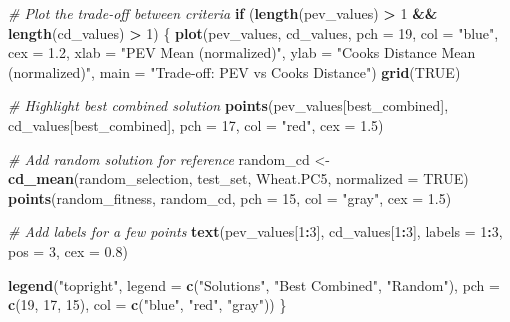 \documentclass[
]{article}
\newenvironment{Shaded}{\begin{snugshade}}{\end{snugshade}}
\newcommand{\AttributeTok}[1]{\textcolor[rgb]{0.13,0.29,0.53}{#1}}
\newcommand{\CommentTok}[1]{\textcolor[rgb]{0.56,0.35,0.01}{\textit{#1}}}
\newcommand{\ConstantTok}[1]{\textcolor[rgb]{0.56,0.35,0.01}{#1}}
\newcommand{\ControlFlowTok}[1]{\textcolor[rgb]{0.13,0.29,0.53}{\textbf{#1}}}
\newcommand{\DecValTok}[1]{\textcolor[rgb]{0.00,0.00,0.81}{#1}}
\newcommand{\FloatTok}[1]{\textcolor[rgb]{0.00,0.00,0.81}{#1}}
\newcommand{\FunctionTok}[1]{\textcolor[rgb]{0.13,0.29,0.53}{\textbf{#1}}}
\newcommand{\NormalTok}[1]{#1}
\newcommand{\OtherTok}[1]{\textcolor[rgb]{0.56,0.35,0.01}{#1}}
\newcommand{\SpecialCharTok}[1]{\textcolor[rgb]{0.81,0.36,0.00}{\textbf{#1}}}
\newcommand{\StringTok}[1]{\textcolor[rgb]{0.31,0.60,0.02}{#1}}
\begin{document}
\begin{Shaded}
\begin{Highlighting}[]
\CommentTok{\# Plot the trade{-}off between criteria}
\ControlFlowTok{if}\NormalTok{ (}\FunctionTok{length}\NormalTok{(pev\_values) }\SpecialCharTok{\textgreater{}} \DecValTok{1} \SpecialCharTok{\&\&} \FunctionTok{length}\NormalTok{(cd\_values) }\SpecialCharTok{\textgreater{}} \DecValTok{1}\NormalTok{) \{}
  \FunctionTok{plot}\NormalTok{(pev\_values, cd\_values,}
       \AttributeTok{pch =} \DecValTok{19}\NormalTok{, }\AttributeTok{col =} \StringTok{"blue"}\NormalTok{, }\AttributeTok{cex =} \FloatTok{1.2}\NormalTok{,}
       \AttributeTok{xlab =} \StringTok{"PEV Mean (normalized)"}\NormalTok{, }
       \AttributeTok{ylab =} \StringTok{"Cook\textquotesingle{}s Distance Mean (normalized)"}\NormalTok{,}
       \AttributeTok{main =} \StringTok{"Trade{-}off: PEV vs Cook\textquotesingle{}s Distance"}\NormalTok{)}
  \FunctionTok{grid}\NormalTok{(}\ConstantTok{TRUE}\NormalTok{)}
  
  \CommentTok{\# Highlight best combined solution}
  \FunctionTok{points}\NormalTok{(pev\_values[best\_combined], cd\_values[best\_combined], }
         \AttributeTok{pch =} \DecValTok{17}\NormalTok{, }\AttributeTok{col =} \StringTok{"red"}\NormalTok{, }\AttributeTok{cex =} \FloatTok{1.5}\NormalTok{)}
  
  \CommentTok{\# Add random solution for reference}
\NormalTok{  random\_cd }\OtherTok{\textless{}{-}} \FunctionTok{cd\_mean}\NormalTok{(random\_selection, test\_set, Wheat.PC5, }\AttributeTok{normalized =} \ConstantTok{TRUE}\NormalTok{)}
  \FunctionTok{points}\NormalTok{(random\_fitness, random\_cd, }\AttributeTok{pch =} \DecValTok{15}\NormalTok{, }\AttributeTok{col =} \StringTok{"gray"}\NormalTok{, }\AttributeTok{cex =} \FloatTok{1.5}\NormalTok{)}
  
  \CommentTok{\# Add labels for a few points}
  \FunctionTok{text}\NormalTok{(pev\_values[}\DecValTok{1}\SpecialCharTok{:}\DecValTok{3}\NormalTok{], cd\_values[}\DecValTok{1}\SpecialCharTok{:}\DecValTok{3}\NormalTok{], }\AttributeTok{labels =} \DecValTok{1}\SpecialCharTok{:}\DecValTok{3}\NormalTok{, }\AttributeTok{pos =} \DecValTok{3}\NormalTok{, }\AttributeTok{cex =} \FloatTok{0.8}\NormalTok{)}
  
  \FunctionTok{legend}\NormalTok{(}\StringTok{"topright"}\NormalTok{, }
         \AttributeTok{legend =} \FunctionTok{c}\NormalTok{(}\StringTok{"Solutions"}\NormalTok{, }\StringTok{"Best Combined"}\NormalTok{, }\StringTok{"Random"}\NormalTok{),}
         \AttributeTok{pch =} \FunctionTok{c}\NormalTok{(}\DecValTok{19}\NormalTok{, }\DecValTok{17}\NormalTok{, }\DecValTok{15}\NormalTok{),}
         \AttributeTok{col =} \FunctionTok{c}\NormalTok{(}\StringTok{"blue"}\NormalTok{, }\StringTok{"red"}\NormalTok{, }\StringTok{"gray"}\NormalTok{))}
\NormalTok{\}}
\end{Highlighting}
\end{Shaded}
\end{document}
